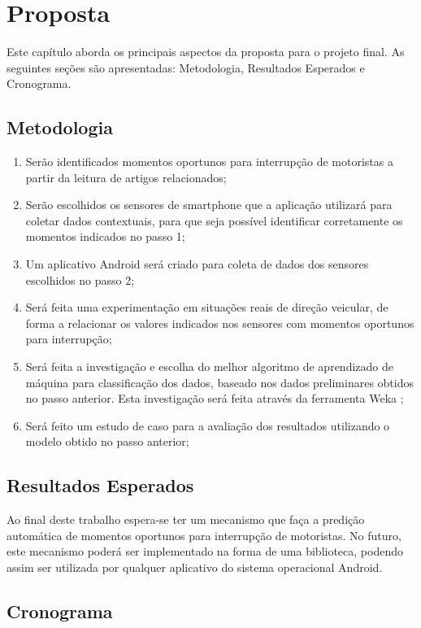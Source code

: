 \chapter{Proposta}
\label{proposta}
Este capítulo aborda os principais aspectos da proposta para o projeto final. As seguintes seções são apresentadas:
Metodologia, Resultados Esperados e Cronograma.

\section{Metodologia}
\label{metodologia}

\begin{enumerate}
  \item Serão identificados momentos oportunos para interrupção de motoristas a partir da leitura de artigos
relacionados;
  \item Serão escolhidos os sensores de smartphone que a aplicação utilizará para coletar dados contextuais, para
que seja possível identificar corretamente os momentos indicados no passo 1;
  \item Um aplicativo Android será criado para coleta de dados dos sensores escolhidos no passo 2;
  \item Será feita uma experimentação em situações reais de direção veicular, de forma a relacionar os valores indicados
nos sensores com momentos oportunos para interrupção;
  \item Será feita a investigação e escolha do melhor algoritmo de aprendizado de máquina para classificação dos dados,
baseado nos dados preliminares obtidos no passo anterior. Esta investigação será feita através da ferramenta Weka
\cite{hall2009weka};
  \item Será feito um estudo de caso para a avaliação dos resultados utilizando o modelo obtido no passo anterior;
\end{enumerate}

\section{Resultados Esperados}
\label{resultados}

Ao final deste trabalho espera-se ter um mecanismo que faça a predição automática de momentos oportunos para
interrupção de motoristas. No futuro, este mecanismo poderá ser implementado na forma de uma biblioteca, podendo assim
ser utilizada por qualquer aplicativo do sistema operacional Android.

\section{Cronograma}
\label{cronograma}

